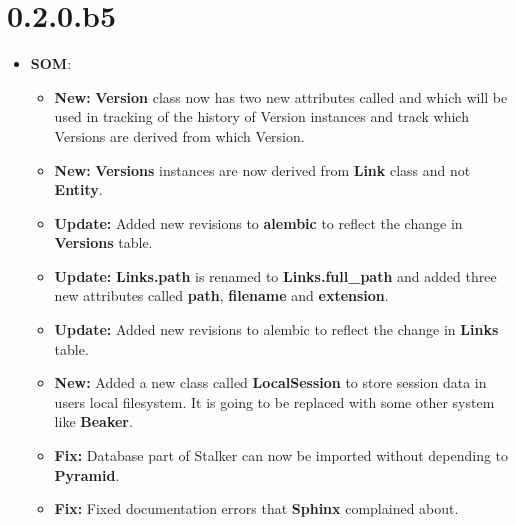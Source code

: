 \documentclass[a4paper,10pt,english]{sphinxmanual}
\begin{document}
\section{0.2.0.b5}
\label{changelog:b5}\begin{itemize}
\item {} 
\textbf{SOM}:
\begin{itemize}
\item {} 
\textbf{New:} \textbf{Version} class now has two new attributes called  and
 which will be used in tracking of the history of Version
instances and track which Versions are derived from which Version.

\item {} 
\textbf{New:} \textbf{Versions} instances are now derived from \textbf{Link} class and not
\textbf{Entity}.

\item {} 
\textbf{Update:} Added new revisions to \textbf{alembic} to reflect the change in
\textbf{Versions} table.

\item {} 
\textbf{Update:} \textbf{Links.path} is renamed to \textbf{Links.full\_path} and added
three new attributes called \textbf{path}, \textbf{filename} and \textbf{extension}.

\item {} 
\textbf{Update:} Added new revisions to alembic to reflect the change in
\textbf{Links} table.

\item {} 
\textbf{New:} Added a new class called \textbf{LocalSession} to store session data in
users local filesystem. It is going to be replaced with some other system
like \textbf{Beaker}.

\item {} 
\textbf{Fix:} Database part of Stalker can now be imported without depending to
\textbf{Pyramid}.

\item {} 
\textbf{Fix:} Fixed documentation errors that \textbf{Sphinx} complained about.

\end{itemize}

\end{itemize}
\end{document}

